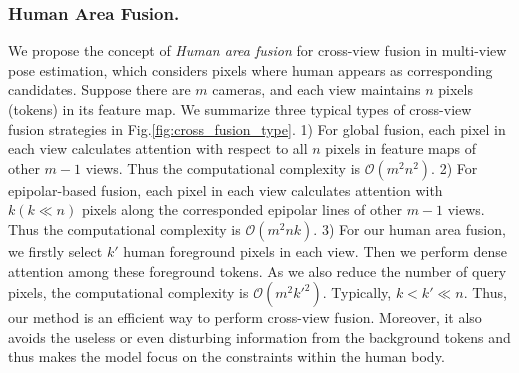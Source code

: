 \documentclass[runningheads]{llncs}
\begin{document}
\subsubsection{Human Area Fusion. }
We propose the concept of \textit{Human area fusion} for cross-view fusion in multi-view pose estimation, which considers pixels where human appears as corresponding candidates.
Suppose there are $m$ cameras, and each view maintains $n$ pixels (tokens) in its feature map. 
We summarize three typical types of cross-view fusion strategies in Fig.\ref{fig:cross_fusion_type}. 
1) For global fusion, each pixel in each view calculates attention with respect to all $n$ pixels in feature maps of other $m-1$ views. Thus the computational complexity is $\mathcal{O}(m^2n^2)$.
2) For epipolar-based fusion, each pixel in each view calculates attention with $k (k \ll n)$ pixels along the corresponded epipolar lines of other $m-1$ views. Thus the computational complexity is $\mathcal{O}(m^2nk)$. 
3) For our human area fusion, we firstly select $k'$ human foreground pixels in each view. Then we perform dense attention among these foreground tokens. As we also reduce the number of query pixels, the computational complexity is $\mathcal{O}(m^2k'^2)$. Typically, $k < k' \ll n$. 
Thus, our method is an efficient way to perform cross-view fusion. Moreover, it also avoids the useless or even disturbing information from the background tokens and thus makes the model focus on the constraints within the human body. 
\end{document}
